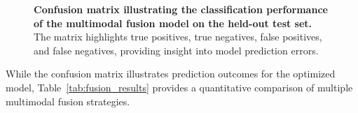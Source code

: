 \documentclass[10pt,letterpaper]{article}
\begin{document}
                                                                                                                          \begin{figure}[!h]
                                                                                                                          \caption{\textbf{Confusion matrix illustrating the classification performance of the multimodal fusion model on the held-out test set.}
                                                                                                                          The matrix highlights true positives, true negatives, false positives, and false negatives, providing insight into model prediction errors.}
                                                                                                                          \label{fig:confusion_matrix}
                                                                                                                          \end{figure}

                                                                                                                          While the confusion matrix illustrates prediction outcomes for the optimized model, Table~\ref{tab:fusion_results} provides a quantitative comparison of multiple multimodal fusion strategies.
\end{document}
